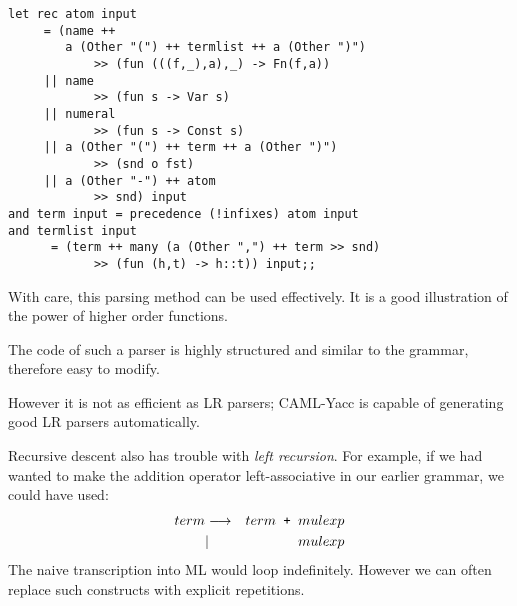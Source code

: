 \begin{slide*}


\vspace*{0.5cm}

\begin{black}\begin{footnotesize}\begin{verbatim}
let rec atom input
     = (name ++
        a (Other "(") ++ termlist ++ a (Other ")")
            >> (fun (((f,_),a),_) -> Fn(f,a))
     || name
            >> (fun s -> Var s)
     || numeral
            >> (fun s -> Const s)
     || a (Other "(") ++ term ++ a (Other ")")
            >> (snd o fst)
     || a (Other "-") ++ atom
            >> snd) input
and term input = precedence (!infixes) atom input
and termlist input
      = (term ++ many (a (Other ",") ++ term >> snd)
            >> (fun (h,t) -> h::t)) input;;
\end{verbatim}\end{footnotesize}\end{black}

\end{slide*}



\begin{slide*}


\vspace*{0.3cm}

With care, this parsing method can be used effectively. It is a good
illustration of the power of higher order functions.

The code of such a parser is highly structured and similar to the grammar,
therefore easy to modify.

However it is not as efficient as LR parsers; CAML-Yacc is capable of
generating good LR parsers automatically.

Recursive descent also has trouble with {\em left recursion}. For example, if
we had wanted to make the addition operator left-associative in our earlier
grammar, we could have used:
{\red
\begin{eqnarray*}
term     & \goesto & term {\verb! + !} mulexp                   \\
         & |       & mulexp
\end{eqnarray*}}
The naive transcription into ML would loop indefinitely. However we can often
replace such constructs with explicit repetitions.


\end{slide*}




